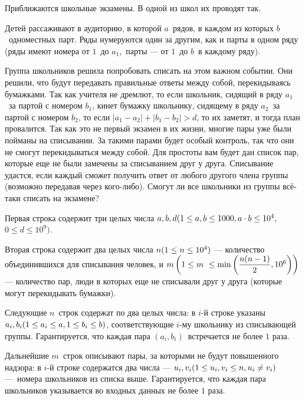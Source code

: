
Приближаются школьные экзамены. В одной из школ их проводят так.

Детей рассаживают в аудиторию, в которой $a$ рядов, в каждом из которых $b$ одноместных парт. Ряды нумеруются один за другим, как и парты в одном ряду (ряды имеют номера от $1$ до $a_1$, парты — от $1$ до $b$ в каждому ряду). 

Группа школьников решила попробовать списать на этом важном событии. Они решили, что будут передавать правильные ответы между собой, перекидываясь бумажками. Так как учителя не дремлют, то если школьник, сидящий в ряду $a_1$ за партой с номером $b_1$, кинет бумажку школьнику, сидящему в ряду $a_2$ за партой с номером $b_2$, то если $\left|a_1-a_2\right| + \left|b_1-b_2\right| > d$, то их заметят, и тогда план провалится. Так как это не первый экзамен в их жизни, многие пары уже были пойманы на списывании. За такими парами будет особый контроль, так что они не смогут перекидываться между собой. Для простоты вам будет дан список пар, которые еще не были замечены за списыванием друг у друга. Списывание удастся, если каждый сможет получить ответ от любого другого члена группы (возможно передавая через кого-либо). Смогут ли все школьники из группы всё-таки списать на экзамене?


Первая строка содержит три целых числа $a, b, d\space (1\leq a, b\leq 1000,\space a\cdot b \leq 10^4,$ \linebreak $0\leq d\leq 10^9)$.

Вторая строка содержит два целых числа $n\space(1\leq n \leq 10^4)$ — количество объединившихся для списывания человек, и $m\space\left(1\leq m \leq \min{\left(\dfrac{n(n-1)}{2}, 10^6\right)}\right)$ — количество пар, люди в которых еще не списывали друг у друга (которые могут перекидывать бумажки).

Следующие $n$ строк содержат по два целых числа: в $i$-й строке указаны \linebreak $a_i, b_i\space(1\leq a_i\leq a,\space 1\leq b_i\leq b)$, соответствующие $i$-му школьнику из списывающей группы. Гарантируется, что каждая пара $\left(a_i, b_i\right)$ встречается не более $1$ раза.

Дальнейшие $m$ строк описывают пары, за которыми не будут повышенного надзора: в $i$-й строке содержатся два числа — $u_i, v_i\space (1\leq u_i, v_i \leq n, \space u_i \neq v_i)$ — номера школьников из списка выше. Гарантируется, что каждая пара школьников указывается во входных данных не более $1$ раза.

